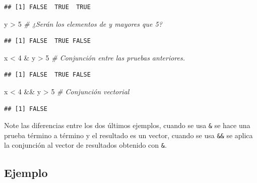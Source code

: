 \documentclass[
]{book}
\makeatletter
\newenvironment{Shaded}{\begin{snugshade}}{\end{snugshade}}
\newcommand{\CommentTok}[1]{\textcolor[rgb]{0.56,0.35,0.01}{\textit{#1}}}
\newcommand{\DecValTok}[1]{\textcolor[rgb]{0.00,0.00,0.81}{#1}}
\newcommand{\NormalTok}[1]{#1}
\newcommand{\SpecialCharTok}[1]{\textcolor[rgb]{0.00,0.00,0.00}{#1}}
\newenvironment{kframe}{%
\medskip{}
\setlength{\fboxsep}{.8em}
 \def\at@end@of@kframe{}%
 \ifinner\ifhmode%
  \def\at@end@of@kframe{\end{minipage}}%
  \begin{minipage}{\columnwidth}%
 \fi\fi%
 \def\FrameCommand##1{\hskip\@totalleftmargin \hskip-\fboxsep
 \colorbox{shadecolor}{##1}\hskip-\fboxsep
     \hskip-\linewidth \hskip-\@totalleftmargin \hskip\columnwidth}%
 \MakeFramed {\advance\hsize-\width
   \@totalleftmargin\z@ \linewidth\hsize
   \@setminipage}}%
 {\par\unskip\endMakeFramed%
 \at@end@of@kframe}
\renewenvironment{Shaded}{\begin{kframe}}{\end{kframe}}
\makeatother
\begin{document}
\begin{verbatim}
## [1] FALSE  TRUE  TRUE
\end{verbatim}

\begin{Shaded}
\begin{Highlighting}[]
\NormalTok{y }\SpecialCharTok{\textgreater{}} \DecValTok{5}  \CommentTok{\# ¿Serán los elementos de y mayores que 5?}
\end{Highlighting}
\end{Shaded}

\begin{verbatim}
## [1] FALSE  TRUE FALSE
\end{verbatim}

\begin{Shaded}
\begin{Highlighting}[]
\NormalTok{x }\SpecialCharTok{\textless{}} \DecValTok{4} \SpecialCharTok{\&}\NormalTok{ y }\SpecialCharTok{\textgreater{}} \DecValTok{5}  \CommentTok{\# Conjunción entre las pruebas anteriores.}
\end{Highlighting}
\end{Shaded}

\begin{verbatim}
## [1] FALSE  TRUE FALSE
\end{verbatim}

\begin{Shaded}
\begin{Highlighting}[]
\NormalTok{x }\SpecialCharTok{\textless{}} \DecValTok{4} \SpecialCharTok{\&\&}\NormalTok{ y }\SpecialCharTok{\textgreater{}} \DecValTok{5}  \CommentTok{\# Conjunción vectorial}
\end{Highlighting}
\end{Shaded}

\begin{verbatim}
## [1] FALSE
\end{verbatim}

Note las diferencias entre los dos últimos ejemplos, cuando se usa \texttt{\&} se hace una prueba término a término y el resultado es un vector, cuando se usa \texttt{\&\&} se aplica la conjunción al vector de resultados obtenido con \texttt{\&}.

\hypertarget{ejemplo-8}{%
\subsection*{Ejemplo}\label{ejemplo-8}}
\end{document}
